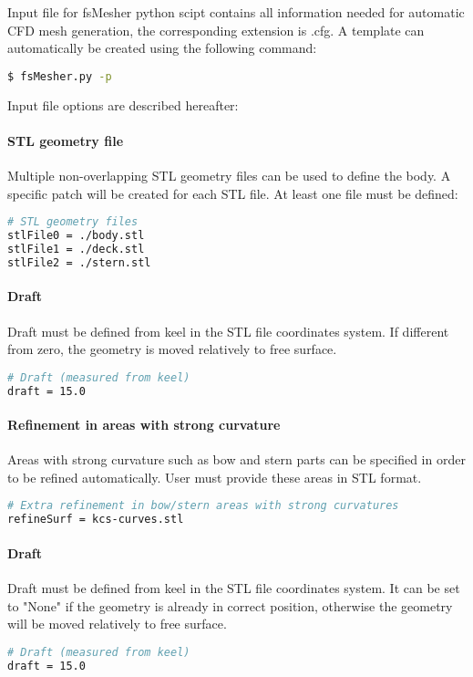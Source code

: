 Input file for fsMesher python scipt contains all information needed for automatic CFD mesh generation, the corresponding extension is .cfg. A template can automatically be created using the following command:
\begin{lstlisting}[language=bash]
$ fsMesher.py -p
\end{lstlisting}

Input file options are described hereafter:
\paragraph{STL geometry file}
Multiple non-overlapping STL geometry files can be used to define the body. A specific patch will be created for each STL file. At least one file must be defined:
\begin{lstlisting}[language=bash]
# STL geometry files
stlFile0 = ./body.stl
stlFile1 = ./deck.stl
stlFile2 = ./stern.stl
\end{lstlisting}

\paragraph{Draft}
Draft must be defined from keel in the STL file coordinates system. If different from zero, the geometry is moved relatively to free surface.
\begin{lstlisting}[language=bash]
# Draft (measured from keel)
draft = 15.0
\end{lstlisting}

\paragraph{Refinement in areas with strong curvature}
Areas with strong curvature such as bow and stern parts can be specified in order to be refined automatically. User must provide these areas in STL format.
\begin{lstlisting}[language=bash]
# Extra refinement in bow/stern areas with strong curvatures
refineSurf = kcs-curves.stl
\end{lstlisting}

\paragraph{Draft}
Draft must be defined from keel in the STL file coordinates system. It can be set to "None" if the geometry is already in correct position, otherwise the geometry will be moved relatively to free surface.
\begin{lstlisting}[language=bash]
# Draft (measured from keel)
draft = 15.0
\end{lstlisting}

